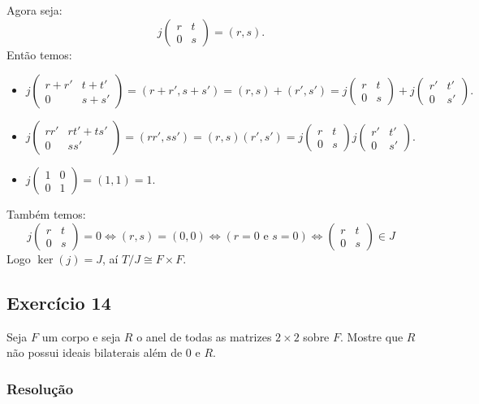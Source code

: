 \documentclass[10pt,a4paper]{article}
\begin{document}
\medskip
\noindent
Agora seja:
\[
j\begin{pmatrix}
r&t\\0&s
\end{pmatrix}=(r,s).
\]
Então temos:
\begin{itemize}
\item $j\begin{pmatrix}
r+r'&t+t'\\0&s+s'
\end{pmatrix}=(r+r',s+s')=(r,s)+(r',s')=j\begin{pmatrix}
r&t\\0&s
\end{pmatrix}+j\begin{pmatrix}
r'&t'\\0&s'
\end{pmatrix}.$
\item $j\begin{pmatrix}
rr'&rt'+ts'\\0&ss'
\end{pmatrix}=(rr',ss')=(r,s)(r',s')=j\begin{pmatrix}
r&t\\0&s
\end{pmatrix}j\begin{pmatrix}
r'&t'\\0&s'
\end{pmatrix}.$
\item $j\begin{pmatrix}
1&0\\0&1
\end{pmatrix}=(1,1)=1.$
\end{itemize}
Também temos:
\[
j\begin{pmatrix}
r&t\\0&s
\end{pmatrix}=0\Leftrightarrow(r,s)=(0,0)\Leftrightarrow(r=0\text{ e }s=0)\Leftrightarrow\begin{pmatrix}
r&t\\0&s
\end{pmatrix}\in J
\]
Logo $\ker(j)=J$, aí $T/J\cong F\times F$.

\subsection*{Exercício 14}
Seja $F$ um corpo e seja $R$ o anel de todas as matrizes $2\times 2$ sobre $F$. Mostre que $R$ não possui ideais bilaterais além de $0$ e $R$.

\subsubsection*{Resolução}
\end{document}

